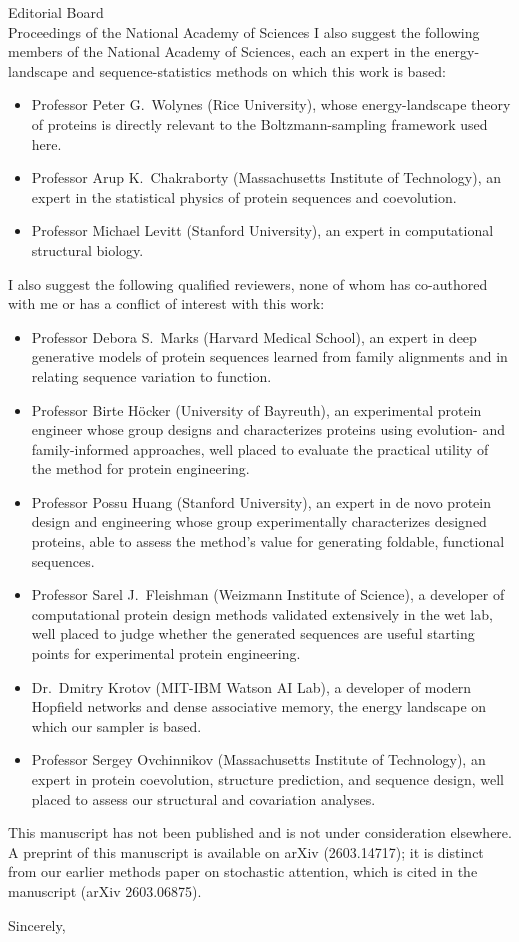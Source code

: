 \documentclass[11pt]{letter}
\begin{document}
\begin{letter}{Editorial Board\\Proceedings of the National Academy of Sciences}
I also suggest the following members of the National Academy of Sciences, each an expert in the energy-landscape and sequence-statistics methods on which this work is based:
\begin{itemize}
\item Professor Peter G.\ Wolynes (Rice University), whose energy-landscape theory of proteins is directly relevant to the Boltzmann-sampling framework used here.
\item Professor Arup K.\ Chakraborty (Massachusetts Institute of Technology), an expert in the statistical physics of protein sequences and coevolution.
\item Professor Michael Levitt (Stanford University), an expert in computational structural biology.
\end{itemize}

I also suggest the following qualified reviewers, none of whom has co-authored with me or has a conflict of interest with this work:
\begin{itemize}
\item Professor Debora S.\ Marks (Harvard Medical School), an expert in deep generative models of protein sequences learned from family alignments and in relating sequence variation to function.
\item Professor Birte H\"ocker (University of Bayreuth), an experimental protein engineer whose group designs and characterizes proteins using evolution- and family-informed approaches, well placed to evaluate the practical utility of the method for protein engineering.
\item Professor Possu Huang (Stanford University), an expert in de novo protein design and engineering whose group experimentally characterizes designed proteins, able to assess the method's value for generating foldable, functional sequences.
\item Professor Sarel J.\ Fleishman (Weizmann Institute of Science), a developer of computational protein design methods validated extensively in the wet lab, well placed to judge whether the generated sequences are useful starting points for experimental protein engineering.
\item Dr.\ Dmitry Krotov (MIT-IBM Watson AI Lab), a developer of modern Hopfield networks and dense associative memory, the energy landscape on which our sampler is based.
\item Professor Sergey Ovchinnikov (Massachusetts Institute of Technology), an expert in protein coevolution, structure prediction, and sequence design, well placed to assess our structural and covariation analyses.
\end{itemize}

This manuscript has not been published and is not under consideration elsewhere. A preprint of this manuscript is available on arXiv (2603.14717); it is distinct from our earlier methods paper on stochastic attention, which is cited in the manuscript (arXiv 2603.06875).

\closing{Sincerely,}

\end{letter}
\end{document}
